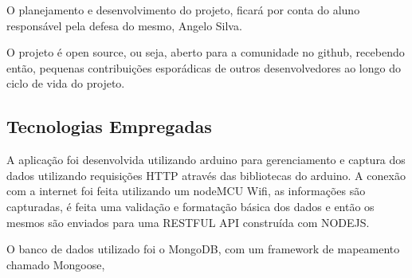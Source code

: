 O planejamento e desenvolvimento do projeto, ficará por conta do aluno responsável pela defesa do mesmo, Angelo Silva.

O projeto é open source, ou seja, aberto para a comunidade no github, recebendo então, pequenas contribuições esporádicas de outros desenvolvedores ao longo do ciclo de vida do projeto.

\subsection{Tecnologias Empregadas}

A aplicação foi desenvolvida utilizando arduino para gerenciamento e captura dos dados utilizando requisições HTTP através das bibliotecas do arduino. A conexão com a internet foi feita utilizando um nodeMCU Wifi, as informações são capturadas, é feita uma validação e formatação básica dos dados e então os mesmos são enviados para uma RESTFUL API construída com NODEJS.

O banco de dados utilizado foi o MongoDB, com um framework de mapeamento chamado Mongoose,
